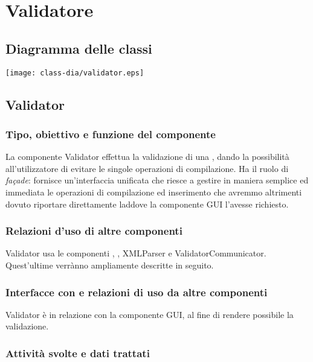\section{Validatore}
\subsection{Diagramma delle classi}
\begin{center}
\texttt{[image: class-dia/validator.eps]}
\end{center}
\subsection{Validator}%
\subsubsection{Tipo, obiettivo e funzione del componente}
La componente Validator effettua la validazione di una \br, dando la possibilit\`a all'utilizzatore di evitare le singole operazioni di compilazione. Ha il ruolo di \textit{fa\c{c}ade}: fornisce un'interfaccia unificata che riesce a gestire in maniera semplice ed immediata le operazioni di compilazione ed inserimento che avremmo altrimenti dovuto riportare direttamente laddove la componente GUI l'avesse richiesto.
\subsubsection{Relazioni d'uso di altre componenti}
Validator usa le componenti \brp, \brl, XMLParser e ValidatorCommunicator. Quest'ultime verr\`anno ampliamente descritte in seguito.
\subsubsection{Interfacce con e relazioni di uso da altre componenti}
Validator \`e in relazione con la componente GUI, al fine di rendere possibile la validazione.
\subsubsection{Attivit\`a svolte e dati trattati}

